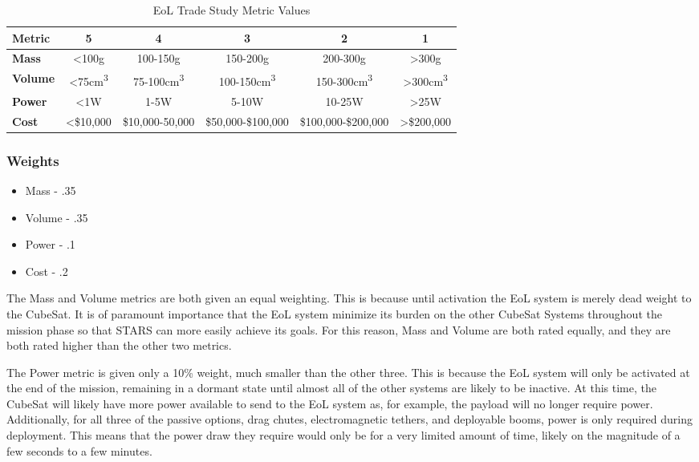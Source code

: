 \begin{table}[H]
\centering
\begin{tabular}{|l|c|c|c|c|c|} 
\hline
    \textbf{Metric} & \textbf{5} & \textbf{4} & \textbf{3} & \textbf{2} & \textbf{1}
    \\
\hline
    \textbf{Mass} & <100g & 100-150g & 150-200g & 200-300g & >300g 
    \\
\hline
    \textbf{Volume} & <75cm\textsuperscript{3} & 75-100cm\textsuperscript{3} & 100-150cm\textsuperscript{3} & 150-300cm\textsuperscript{3} & >300cm\textsuperscript{3} 
    \\
\hline
    \textbf{Power} & <1W & 1-5W & 5-10W & 10-25W & >25W 
    \\
\hline
    \textbf{Cost} & <\$10,000 & \$10,000-50,000 & \$50,000-\$100,000 & \$100,000-\$200,000 & >\$200,000 
    \\

\hline
\end{tabular}
\caption{EoL Trade Study Metric Values}
\label{tbl:EoL_Metric_Scores}
\end{table}
\subsubsection{Weights}
\begin{itemize}
    \item Mass - .35
    \item Volume - .35
    \item Power - .1
    \item Cost - .2
\end{itemize}

The Mass and Volume metrics are both given an equal weighting. This is because until activation the EoL system is merely dead weight to the CubeSat. It is of paramount importance that the EoL system minimize its burden on the other CubeSat Systems throughout the mission phase so that STARS can more easily achieve its goals. For this reason, Mass and Volume are both rated equally, and they are both rated higher than the other two metrics. 

The Power metric is given only a 10\% weight, much smaller than the other three. This is because the EoL system will only be activated at the end of the mission, remaining in a dormant state until almost all of the other systems are likely to be inactive. At this time, the CubeSat will likely have more power available to send to the EoL system as, for example, the payload will no longer require power. Additionally, for all three of the passive options, drag chutes, electromagnetic tethers, and deployable booms, power is only required during deployment. This means that the power draw they require would only be for a very limited amount of time, likely on the magnitude of a few seconds to a few minutes. 

